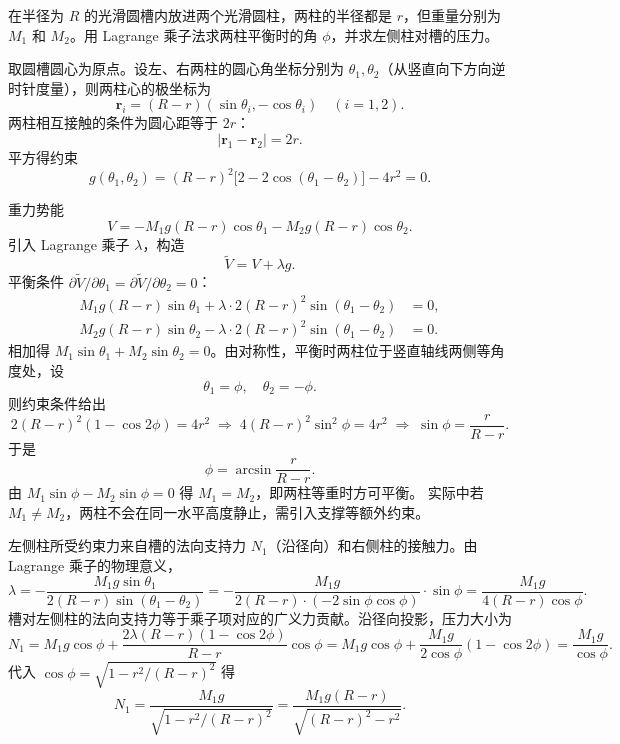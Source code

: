 \begin{question}
在半径为 \(R\) 的光滑圆槽内放进两个光滑圆柱，两柱的半径都是 \(r\)，但重量分别为 \(M_1\) 和 \(M_2\)。用 Lagrange 乘子法求两柱平衡时的角 \(\phi\)，并求左侧柱对槽的压力。

\begin{solution}
取圆槽圆心为原点。设左、右两柱的圆心角坐标分别为 \(\theta_1,\theta_2\)（从竖直向下方向逆时针度量），则两柱心的极坐标为
\[
\boldsymbol r_i = (R-r)(\sin\theta_i, -\cos\theta_i) \quad (i=1,2).
\]
两柱相互接触的条件为圆心距等于 \(2r\)：
\[
|\boldsymbol r_1 - \boldsymbol r_2| = 2r .
\]
平方得约束
\[
g(\theta_1,\theta_2) = (R-r)^2\bigl[2-2\cos(\theta_1-\theta_2)\bigr] - 4r^2 = 0 .
\]

重力势能
\[
V = -M_1 g(R-r)\cos\theta_1 - M_2 g(R-r)\cos\theta_2 .
\]
引入 Lagrange 乘子 \(\lambda\)，构造
\[
\tilde V = V + \lambda g .
\]
平衡条件 \(\partial\tilde V/\partial\theta_1 = \partial\tilde V/\partial\theta_2 = 0\)：
\begin{align*}
M_1 g(R-r)\sin\theta_1 + \lambda\cdot 2(R-r)^2\sin(\theta_1-\theta_2) &= 0, \\
M_2 g(R-r)\sin\theta_2 - \lambda\cdot 2(R-r)^2\sin(\theta_1-\theta_2) &= 0 .
\end{align*}
相加得 \(M_1\sin\theta_1 + M_2\sin\theta_2 = 0\)。由对称性，平衡时两柱位于竖直轴线两侧等角度处，设
\[
\theta_1 = \phi,\quad \theta_2 = -\phi .
\]
则约束条件给出
\[
2(R-r)^2(1-\cos 2\phi) = 4r^2
\;\Longrightarrow\; 4(R-r)^2\sin^2\phi = 4r^2
\;\Longrightarrow\; \sin\phi = \frac{r}{R-r}.
\]
于是
\[
\phi = \arcsin\frac{r}{R-r}.
\]
由 \(M_1\sin\phi - M_2\sin\phi = 0\) 得 \(M_1 = M_2\)，即两柱等重时方可平衡。
实际中若 \(M_1 \neq M_2\)，两柱不会在同一水平高度静止，需引入支撑等额外约束。

左侧柱所受约束力来自槽的法向支持力 \(N_1\)（沿径向）和右侧柱的接触力。由 Lagrange 乘子的物理意义，
\[
\lambda = -\frac{M_1 g\sin\theta_1}{2(R-r)\sin(\theta_1-\theta_2)}
= -\frac{M_1 g}{2(R-r)\cdot(-2\sin\phi\cos\phi)} \cdot \sin\phi
= \frac{M_1 g}{4(R-r)\cos\phi}.
\]
槽对左侧柱的法向支持力等于乘子项对应的广义力贡献。沿径向投影，压力大小为
\[
N_1 = M_1 g\cos\phi + \frac{2\lambda(R-r)(1-\cos 2\phi)}{R-r}\cos\phi
= M_1 g\cos\phi + \frac{M_1 g}{2\cos\phi}(1-\cos 2\phi)
= \frac{M_1 g}{\cos\phi}.
\]
代入 \(\cos\phi = \sqrt{1 - r^2/(R-r)^2}\) 得
\[
\boxed{N_1 = \frac{M_1 g}{\sqrt{1 - r^2/(R-r)^2}} = \frac{M_1 g(R-r)}{\sqrt{(R-r)^2 - r^2}} }.
\]
\end{solution}
\end{question}

